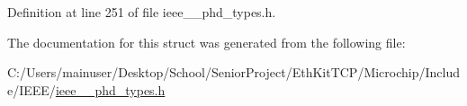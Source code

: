Definition at line 251 of file ieee\+\_\+\_\+phd\+\_\+types.\+h.



The documentation for this struct was generated from the following file\+:\begin{DoxyCompactItemize}
\item 
C\+:/\+Users/mainuser/\+Desktop/\+School/\+Senior\+Project/\+Eth\+Kit\+T\+C\+P/\+Microchip/\+Include/\+I\+E\+E\+E/\hyperlink{ieee__11073__phd__types_8h}{ieee\+\_\+\_\+phd\+\_\+types.\+h}\end{DoxyCompactItemize}
